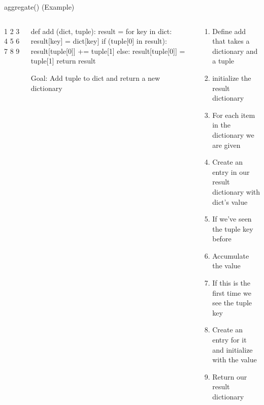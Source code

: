 \documentclass[aspectratio=169]{beamer}
\begin{document}
\begin{frame}[fragile]{aggregate() (Example)}

\begin{columns}[T]
\begin{column}{0.005\textwidth}
\begin{SQL}
1
2
3
4
5
6
7
8
9
\end{SQL}
\end{column}
\begin{column}{0.4\textwidth}
\begin{SQL}
def add (dict, tuple):
  result = {}
  for key in dict:
    result[key] = dict[key]
  if (tuple[0] in result):
    result[tuple[0]] += tuple[1]
  else:
    result[tuple[0]] = tuple[1]
  return result
\end{SQL}

Goal: Add tuple to dict and return a new dictionary
\end{column}
\begin{column}{0.555\textwidth}
\begin{enumerate}
\item Define add that takes a dictionary and a tuple
\item initialize the result dictionary
\item For each item in the dictionary we are given
\item \hspace{1em} Create an entry in our result dictionary with dict's value
\item If we've seen the tuple key before
\item  \hspace{1em}Accumulate the value
\item If this is the first time we see the tuple key
\item  \hspace{1em} Create an entry for it and initialize with the value
\item Return our result dictionary
\end{enumerate}
\end{column}
\end{columns}
\end{frame}
\end{document}
